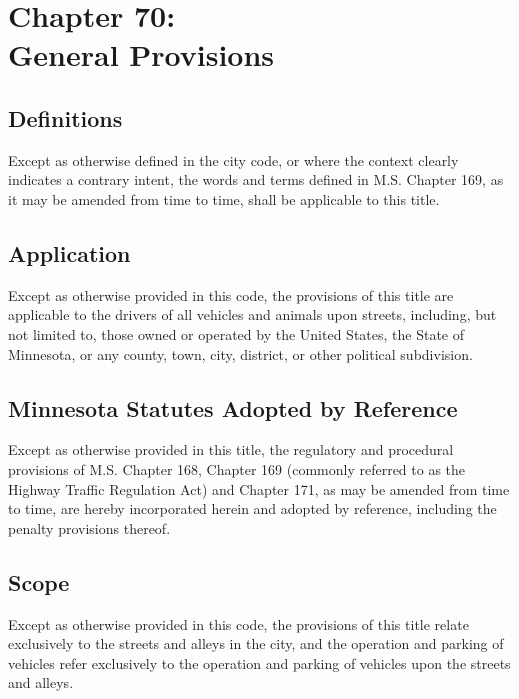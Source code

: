 \chapter*{Chapter 70: \\
	General Provisions}
    \vfill
    \minitoc
    \pagebreak

\section{Definitions}
Except as otherwise defined in the city code, or where the context clearly indicates a contrary intent, the words and terms defined in M.S. Chapter 169, as it may be amended from time to time, shall be applicable to this title.

\section{Application}
Except as otherwise provided in this code, the provisions of this title are applicable to the drivers of all vehicles and animals upon streets, including, but not limited to, those owned or operated by the United States, the State of Minnesota, or any county, town, city, district, or other political subdivision.

\section{Minnesota Statutes Adopted by Reference}
Except as otherwise provided in this title, the regulatory and procedural provisions of M.S. Chapter 168, Chapter 169 (commonly referred to as the Highway Traffic Regulation Act) and Chapter 171, as may be amended from time to time, are hereby incorporated herein and adopted by reference, including the penalty provisions thereof.

\section{Scope}
Except as otherwise provided in this code, the provisions of this title relate exclusively to the streets and alleys in the city, and the operation and parking of vehicles refer exclusively to the operation and parking of vehicles upon the streets and alleys.

